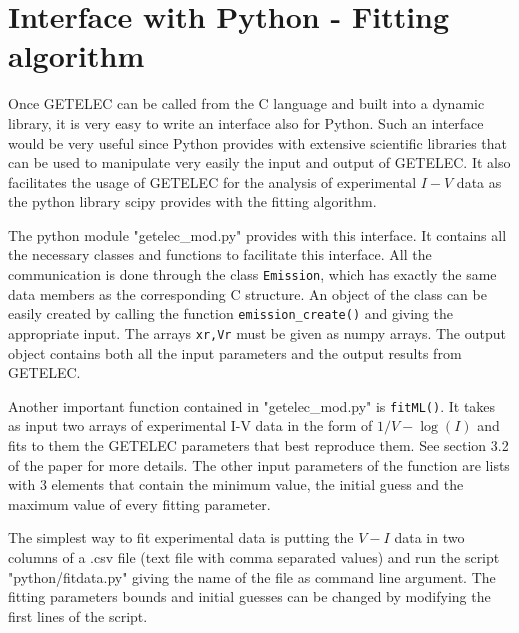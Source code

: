 \documentclass[notitlepage
]{revtex4-1}
\begin{document}
\section{Interface with Python - Fitting algorithm}
\label{sec:Python}

Once GETELEC can be called from the C language and built into a dynamic library, it is very easy to write an interface also for Python. Such an interface would be very useful since Python provides with extensive scientific libraries that can be used to manipulate very easily the input and output of GETELEC. It also facilitates the usage of GETELEC for the analysis of experimental $I-V$ data as the python library scipy provides with the fitting algorithm.

The python module "getelec\_mod.py" provides with this interface. It contains all the necessary classes and functions to facilitate this interface. All the communication is done through the class \texttt{Emission}, which has exactly the same data members as the corresponding C structure. An object of the class can be easily created by calling the function \texttt{emission\_create()} and giving the appropriate input. The arrays \texttt{xr,Vr} must be given as numpy arrays. The output object contains both all the input parameters and the output results from GETELEC.

Another important function contained in "getelec\_mod.py" is \texttt{fitML()}. It takes as input two arrays of experimental I-V data in the form of $1/V-\log(I)$ and fits to them the GETELEC parameters that best reproduce them. See section 3.2 of the paper for more details. The other input parameters of the function are lists with 3 elements that contain the minimum value, the initial guess and the maximum value of every fitting parameter.

The simplest way to fit experimental data is putting the $V-I$ data in two columns of a .csv file (text file with comma separated values) and run the script "python/fitdata.py" giving the name of the file as command line argument. The fitting parameters bounds and initial guesses can be changed by modifying the first lines of the script.
%
\end{document}
